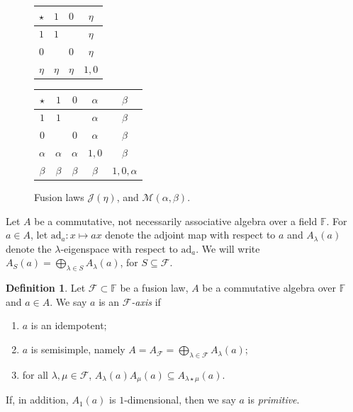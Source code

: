 \documentclass[11pt, a4paper]{article}
\theoremstyle{plain}
\theoremstyle{definition}
\newtheorem{definition}[theorem]{Definition}
\newcommand\al{\alpha}
\newcommand\bt{\beta}
\newcommand\lm{\lambda}
\newcommand\cF{\mathcal{F}}
\newcommand\cJ{\mathcal{J}}
\newcommand\cM{\mathcal{M}}
\newcommand\ad{\mathrm{ad}}
\newcommand\FF{\mathbb{F}}
\newcommand{\0}{\overline{0}}
\newcommand{\2}{\overline{2}}
\newcommand{\1}{\mathbbm{1}}
\begin{document}
\begin{figure}[!ht]
\begin{center}
\begin{minipage}[t]{0.25\linewidth}
{\renewcommand{\arraystretch}{1.5}
\begin{tabular}[t]{c||c|c|c}
$\star$ & $1$ & $0$ & $\eta$ \\
\hline\hline
$1$ & $1$ & & $\eta$ \\
\hline
$0$ & & $0$ & $\eta$ \\
\hline 
$\eta$ & $\eta$ & $\eta$ & $1,0$
\end{tabular}
}
\end{minipage}\hspace{20pt}
%
\begin{minipage}[t]{0.33\linewidth}
{\renewcommand{\arraystretch}{1.5}
\begin{tabular}[t]{c||c|c|c|c}
$\star$ & $1$ & $0$ & $\alpha$ & $\beta$ \\
\hline\hline
$1$ & $1$ & & $\alpha$ & $\beta$ \\
\hline
$0$ & & $0$ & $\alpha$ & $\beta$ \\
\hline 
$\alpha$ & $\alpha$ & $\alpha$ & $1,0$ & $\beta$ \\
\hline 
$\beta$ & $\beta$ & $\beta$ & $\beta$ & $1,0,\alpha$
\end{tabular}
}
\end{minipage}
\end{center}
\caption{Fusion laws $\cJ(\eta)$, and $\cM(\al,\bt)$.}
\label{tab:fusion laws}
\end{figure}

Let $A$ be a commutative, not necessarily associative algebra over a field $\FF$.  For $a \in A$, let $\ad_a \colon x \mapsto ax$ denote the adjoint map with respect to $a$ and $A_\lm(a)$ denote the $\lm$-eigenspace with respect to $\ad_a$.  We will write $A_S(a) = \bigoplus_{\lm \in S} A_\lm(a)$, for $S \subseteq \cF$.

\begin{definition}
Let $\cF \subset \FF$ be a fusion law, $A$ be a commutative algebra over $\FF$ and $a \in A$.  We say $a$ is an \emph{$\cF$-axis} if 
\begin{enumerate}
\item $a$ is an idempotent;
\item $a$ is semisimple, namely $A = A_\cF = \bigoplus_{\lambda \in \cF} A_\lambda(a)$;
\item for all $\lambda, \mu \in \cF$, $A_\lambda(a) A_\mu(a) \subseteq A_{\lambda \star \mu}(a)$.
\end{enumerate}
If, in addition, $A_1(a)$ is $1$-dimensional, then we say $a$ is \emph{primitive}.
\end{definition}
\end{document}
